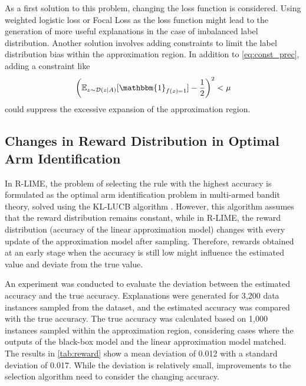 \documentclass[runningheads]{llncs}
\begin{document}
As a first solution to this problem, changing the loss function is considered. Using weighted logistic loss or Focal Loss \cite{lin2020focal} as the loss function might lead to the generation of more useful explanations in the case of imbalanced label distribution. Another solution involves adding constraints to limit the label distribution bias within the approximation region. In addition to \cref{eq:const_prec}, adding a constraint like
\begin{equation}
  {\left(\mathbb{E}_{z\sim\mathcal{D}(z\mid A)}[\mathbbm{1}_{f(z)=1}]-\frac{1}{2}\right)}^2<\mu
\end{equation}
could suppress the excessive expansion of the approximation region.

\subsection{Changes in Reward Distribution in Optimal Arm Identification}\label{sec:reward}
{%
  \renewcommand{\arraystretch}{1.1}
  \begin{table}[tbp]
    \centering
    \caption{%
      Deviation between the estimated accuracy and the true accuracy.
    }\label{tab:reward}
    
  \end{table}
}
In R-LIME, the problem of selecting the rule with the highest accuracy is formulated as the optimal arm identification problem in multi-armed bandit theory, solved using the KL-LUCB algorithm \cite{kaufmann2013information}. However, this algorithm assumes that the reward distribution remains constant, while in R-LIME, the reward distribution (accuracy of the linear approximation model) changes with every update of the approximation model after sampling. Therefore, rewards obtained at an early stage when the accuracy is still low might influence the estimated value and deviate from the true value.

An experiment was conducted to evaluate the deviation between the estimated accuracy and the true accuracy. Explanations were generated for 3,200 data instances sampled from the dataset, and the estimated accuracy was compared with the true accuracy. The true accuracy was calculated based on 1,000 instances sampled within the approximation region, considering cases where the outputs of the black-box model and the linear approximation model matched. The results in \cref{tab:reward} show a mean deviation of 0.012 with a standard deviation of 0.017. While the deviation is relatively small, improvements to the selection algorithm need to consider the changing accuracy.
\end{document}
